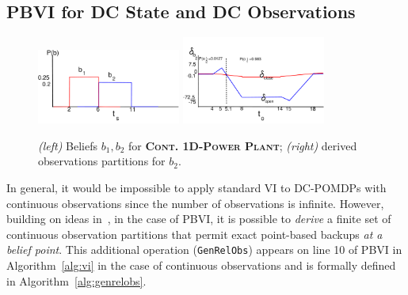\documentclass{article} %
\begin{document}
\subsection{PBVI for DC State and DC Observations} 
\label{sec:cont_obs}

\begin{figure}[tbp!]
\vspace{-3mm}
\centering
\hspace{-20mm}
\includegraphics[width=0.42\textwidth]{pics/beliefs_2.pdf}
\hspace{10mm}
\includegraphics[width=0.42\textwidth]{pics/delta_b2_2.pdf}
\hspace{-17mm}
\vspace{-2mm}
\caption{\footnotesize 
{\it (left)} Beliefs $b_1,b_2$ for \textsc{\bf Cont. 1D-Power Plant}; 
{\it (right)} derived observations partitions for $b_2$.
}
\label{fig:beliefs}
\end{figure}

In general, it would be impossible to apply standard VI to 
DC-POMDPs with continuous observations since the number of observations
is infinite.  However, building on ideas in~\cite{pascal_ijcai05},
in the case of PBVI, it is possible to \emph{derive} a finite set of
continuous observation partitions that permit exact point-based backups
\emph{at a belief point}.
This additional operation (\texttt{GenRelObs}) appears on line 10 of PBVI in 
Algorithm~\ref{alg:vi} in the case of continuous observations and is
formally defined in Algorithm~\ref{alg:genrelobs}.
\end{document}
